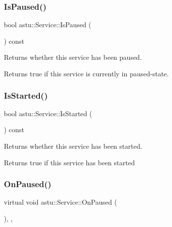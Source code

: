 \subsubsection{\texorpdfstring{Is\+Paused()}{IsPaused()}}
{\footnotesize\ttfamily bool astu\+::\+Service\+::\+Is\+Paused (\begin{DoxyParamCaption}{ }\end{DoxyParamCaption}) const}

Returns whether this service has been paused.

\begin{DoxyReturn}{Returns}
{\ttfamily true} if this service is currently in paused-\/state. 
\end{DoxyReturn}
\mbox{\label{classastu_1_1Service_a55a5c6e1584aca9c8f02364f84bb325e}} 
\subsubsection{\texorpdfstring{Is\+Started()}{IsStarted()}}
{\footnotesize\ttfamily bool astu\+::\+Service\+::\+Is\+Started (\begin{DoxyParamCaption}{ }\end{DoxyParamCaption}) const\hspace{0.3cm}{\ttfamily [inline]}}

Returns whether this service has been started.

\begin{DoxyReturn}{Returns}
{\ttfamily true} if this service has been started 
\end{DoxyReturn}
\mbox{\label{classastu_1_1Service_af6795fd14c86f340dd5e46e667ffae75}} 
\subsubsection{\texorpdfstring{On\+Paused()}{OnPaused()}}
{\footnotesize\ttfamily virtual void astu\+::\+Service\+::\+On\+Paused (\begin{DoxyParamCaption}{ }\end{DoxyParamCaption})\hspace{0.3cm}{\ttfamily [inline]}, {\ttfamily [protected]}, {\ttfamily [virtual]}}

